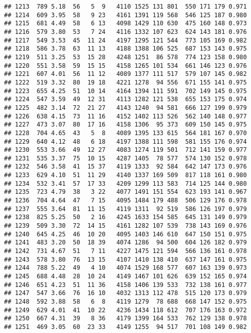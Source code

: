 \documentclass[]{article}
\begin{document}
\begin{verbatim}
## 1213  789 5.18  56   5  9   4110 1525 131 801  550 171 179 0.971
## 1214  609 3.95  58   9 23   4161 1391 119 568  546 125 187 0.980
## 1215  681 4.49  58   6 13   4098 1429 110 630  475 160 148 0.973
## 1216  579 3.80  53   7 24   4116 1332 107 623  624 143 181 0.976
## 1217  549 3.53  45  11 24   4197 1295 121 544  773 105 169 0.982
## 1218  586 3.78  63  11 13   4188 1388 106 525  687 153 143 0.975
## 1219  511 3.25  53  15 28   4248 1251  86 578  774 123 158 0.980
## 1220  551 3.58  59  15 15   4158 1265 101 534  661 146 123 0.976
## 1221  607 4.01  56  11 12   4089 1377 111 517  579 107 145 0.982
## 1222  519 3.32  80  19 18   4221 1278  94 556  671 155 141 0.975
## 1223  655 4.25  51  10 14   4164 1394 111 591  702 149 145 0.975
## 1224  547 3.59  49  12 31   4113 1282 121 538  655 153 175 0.974
## 1225  482 3.14  72  21 27   4143 1240  94 581  666 127 199 0.979
## 1226  638 4.15  73  11 16   4152 1402 113 526  562 140 148 0.977
## 1227  473 3.07  80  17 16   4158 1306  95 373  609 150 145 0.975
## 1228  704 4.65  43   5  8   4089 1395 133 615  564 181 167 0.970
## 1229  640 4.12  48   6 18   4197 1388 111 598  581 155 176 0.974
## 1230  553 3.66  49  12 27   4083 1274 119 501  712 141 159 0.977
## 1231  535 3.37  75  10 15   4287 1405  78 577  574 130 152 0.978
## 1232  546 3.58  41  15 37   4119 1333  92 584  642 147 173 0.976
## 1233  629 4.10  51  11 29   4140 1337 169 509  817 118 161 0.980
## 1234  532 3.41  57  17 33   4209 1299 113 583  714 125 144 0.980
## 1235  723 4.79  38   3 22   4077 1491 151 554  623 193 141 0.967
## 1236  704 4.64  47   7 15   4095 1484 179 488  506 129 176 0.978
## 1237  555 3.64  81  11 15   4119 1311  92 519  586 126 197 0.979
## 1238  825 5.25  50   2 16   4245 1633 154 585  645 131 149 0.979
## 1239  509 3.30  72  14 15   4161 1282 107 539  738 143 169 0.976
## 1240  645 4.25  46  10 20   4095 1403 146 610  647 150 151 0.975
## 1241  483 3.20  50  18 39   4074 1286  94 500  604 126 182 0.979
## 1242  731 4.67  51   7 11   4227 1475 121 594  566 136 161 0.978
## 1243  578 3.80  76  13 15   4107 1410 138 410  637 147 161 0.975
## 1244  788 5.22  49   4 10   4074 1529 168 577  607 163 139 0.973
## 1245  688 4.48  28  10 24   4149 1467 101 626  639 152 165 0.974
## 1246  651 4.23  51  11 36   4158 1406 139 533  732 138 161 0.977
## 1247  547 3.66  76  16 10   4032 1313 112 478  515 120 173 0.979
## 1248  592 3.88  58   6  8   4119 1279  78 688  668 147 152 0.975
## 1249  629 4.01  41  10 22   4236 1434 118 612  707 176 163 0.972
## 1250  667 4.31  39   8 36   4179 1399 164 533  762 129 138 0.978
## 1251  469 3.05  60  23 33   4149 1255  94 517  701 108 149 0.982

\end{verbatim}
\end{document}
